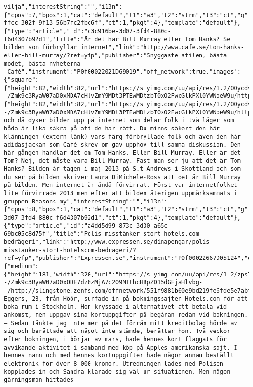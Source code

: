 \begin{verbatim}
vilja","interestString":"","i13n":{"cpos":7,"bpos":1,"cat":"default","t1":"a3","t2":"strm","t3":"ct","g":"4e6dc677-ffcc-302f-9f13-56b7fc2fbc6f","ct":1,"pkgt":4},"template":"default"},{"type":"article","id":"c3c916be-3d07-3fd4-880c-f6d4307b92d1","title":"Är det här Bill Murray eller Tom Hanks? Se bilden som förbryllar internet","link":"http://www.cafe.se/tom-hanks-eller-bill-murray/?ref=yfp","publisher":"Snyggaste stilen, bästa modet, bästa nyheterna – Café","instrument":"P0f00022021D69019","off_network":true,"images":{"square":{"height":82,"width":82,"url":"https://s.yimg.com/uu/api/res/1.2/OOycdvHjDuPCUDOJ0k.UnQ--/Zmk9c3RyaW07aD0xMDA7cHlvZmY9MDt3PTEwMDtzbT0xO2FwcGlkPXl0YWNoeW9u/http://slingstone.zenfs.com/offnetwork/b0bd8ea9423432539c4016dc38d07e14","defer":1}},"image":{"height":82,"width":82,"url":"https://s.yimg.com/uu/api/res/1.2/OOycdvHjDuPCUDOJ0k.UnQ--/Zmk9c3RyaW07aD0xMDA7cHlvZmY9MDt3PTEwMDtzbT0xO2FwcGlkPXl0YWNoeW9u/http://slingstone.zenfs.com/offnetwork/b0bd8ea9423432539c4016dc38d07e14","defer":1},"summary":"Då och då dyker bilder upp på internet som delar folk i två läger som båda är lika säkra på att de har rätt. Du minns säkert den här klänningen (extern länk) vars färg förbryllade folk och även den här adidasjackan som Café skrev om gav upphov till samma diskussion. Den här gången handlar det om Tom Hanks. Eller Bill Murray. Eller är det Tom? Nej, det måste vara Bill Murray. Fast man ser ju att det är Tom Hanks? Bilden är tagen i maj 2013 på S.t Andrews i Skottland och som du ser på bilden skriver Laura DiMichele-Ross att det är Bill Murray på bilden. Men internet är ändå förvirrat. Först var internetfolket lite förvirrade 2013 men efter att bilden återigen uppmärksammats i gruppen Reasons my","interestString":"","i13n":{"cpos":8,"bpos":1,"cat":"default","t1":"a3","t2":"strm","t3":"ct","g":"c3c916be-3d07-3fd4-880c-f6d4307b92d1","ct":1,"pkgt":4},"template":"default"},{"type":"article","id":"a4dd5d99-873c-3d30-a65c-69bc05c8d75f","title":"Polis misstänker stort hotels.com-bedrägeri","link":"http://www.expressen.se/dinapengar/polis-misstanker-stort-hotelscom-bedrageri/?ref=yfp","publisher":"Expressen.se","instrument":"P0f00022667D05124","off_network":true,"images":{"medium":{"height":181,"width":320,"url":"https://s.yimg.com/uu/api/res/1.2/zps7iXHM2.yHk9GvcHnKMw--/Zmk9c3RyaW07aD0xODE7dz0zMjA7c209MTthcHBpZD15dGFjaHlvbg--/http://slingstone.zenfs.com/offnetwork/551f9881b60e9bd219fe6fde5e7abf3d","defer":1}},"template":"featured","summary":"Sandra Eggers, 28, från Höör, surfade in på bokningssajten Hotels.com för att boka rum i Stockholm. Hon kryssade i alternativet att betala vid ankomst, men uppgav sina kortuppgifter på begäran redan vid bokningen. – Sedan tänkte jag inte mer på det förrän mitt kreditbolag hörde av sig och berättade att något inte stämde, berättar hon. Två veckor efter bokningen, i början av mars, hade hennes kort flaggats för avvikande aktivitet i samband med köp på Apples amerikanska sajt. I hennes namn och med hennes kortuppgifter hade någon annan beställt elektronik för över 8 000 kronor. Utredningen lades ned Polisen kopplades in och Sandra klarade sig väl ur situationen. Men någon gärningsman hittades 
\end{verbatim}
